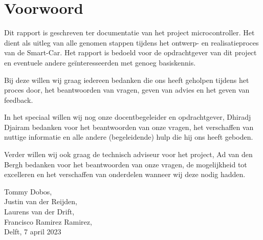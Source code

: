 \section*{Voorwoord}
Dit rapport is geschreven ter documentatie van het project microcontroller. Het dient als uitleg van alle genomen stappen tijdens het ontwerp- en realisatieproces van de \gls{Smart-Car}.  Het rapport is bedoeld voor de opdrachtgever van dit project en eventuele andere geïnteresseerden met genoeg basiskennis. 

Bij deze willen wij graag iedereen bedanken die ons heeft geholpen tijdens het proces door, het beantwoorden van vragen, geven van advies en het geven van feedback. 

In het speciaal willen wij nog onze docentbegeleider en opdrachtgever, Dhiradj Djairam bedanken voor het beantwoorden van onze vragen, het verschaffen van nuttige informatie en alle andere (begeleidende) hulp die hij ons heeft geboden. 

Verder willen wij ook graag de technisch adviseur voor het project, Ad van den Bergh bedanken voor het beantwoorden van onze vragen, de mogelijkheid tot excelleren en het verschaffen van onderdelen wanneer wij deze nodig hadden. 


Tommy Dobos,
\\
Justin van der Reijden,
\\
Laurens van der Drift,
\\
Francisco Ramirez Ramirez,
\\
Delft, 7 april 2023